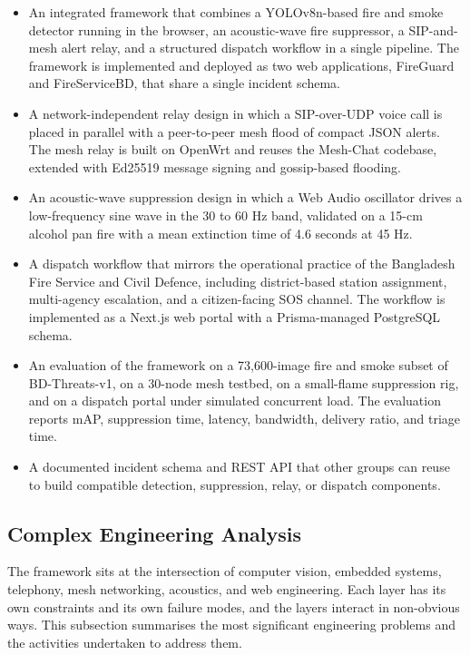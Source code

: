 \begin{itemize}
\item An integrated framework that combines a YOLOv8n-based fire and smoke detector running in the browser, an acoustic-wave fire suppressor, a SIP-and-mesh alert relay, and a structured dispatch workflow in a single pipeline. The framework is implemented and deployed as two web applications, FireGuard and FireServiceBD, that share a single incident schema.
\item A network-independent relay design in which a SIP-over-UDP voice call is placed in parallel with a peer-to-peer mesh flood of compact JSON alerts. The mesh relay is built on OpenWrt and reuses the Mesh-Chat codebase, extended with Ed25519 message signing and gossip-based flooding.
\item An acoustic-wave suppression design in which a Web Audio oscillator drives a low-frequency sine wave in the 30 to 60 Hz band, validated on a 15-cm alcohol pan fire with a mean extinction time of 4.6 seconds at 45 Hz.
\item A dispatch workflow that mirrors the operational practice of the Bangladesh Fire Service and Civil Defence, including district-based station assignment, multi-agency escalation, and a citizen-facing SOS channel. The workflow is implemented as a Next.js web portal with a Prisma-managed PostgreSQL schema.
\item An evaluation of the framework on a 73{,}600-image fire and smoke subset of BD-Threats-v1, on a 30-node mesh testbed, on a small-flame suppression rig, and on a dispatch portal under simulated concurrent load. The evaluation reports mAP, suppression time, latency, bandwidth, delivery ratio, and triage time.
\item A documented incident schema and REST API that other groups can reuse to build compatible detection, suppression, relay, or dispatch components.
\end{itemize}

\subsection{Complex Engineering Analysis}

The framework sits at the intersection of computer vision, embedded systems, telephony, mesh networking, acoustics, and web engineering. Each layer has its own constraints and its own failure modes, and the layers interact in non-obvious ways. This subsection summarises the most significant engineering problems and the activities undertaken to address them.

